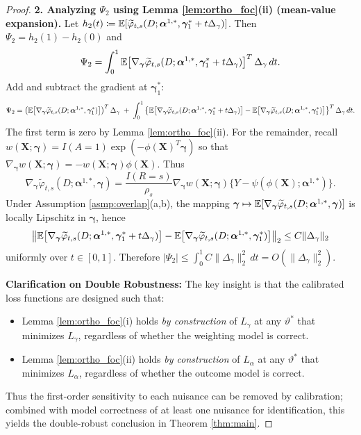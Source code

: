 \documentclass{article}
\begin{document}
\begin{proof}
\textbf{2. Analyzing $\Psi_2$ using Lemma \ref{lem:ortho_foc}(ii) (mean-value expansion).}
Let $h_2(t)\coloneqq \operatorname{\mathbb{E}}[\widetilde{\varphi}_{t,s}(D;\boldsymbol{\alpha}^{1,*},\boldsymbol{\gamma}_1^*+t\Delta_\gamma)]$.
Then $\Psi_2=h_2(1)-h_2(0)$ and
\[
\Psi_2
=
\int_0^1 \operatorname{\mathbb{E}}\!\left[\nabla_{\boldsymbol{\gamma}}\widetilde{\varphi}_{t,s}(D;\boldsymbol{\alpha}^{1,*},\boldsymbol{\gamma}_1^*+t\Delta_\gamma)\right]^T\Delta_\gamma\,dt.
\]
Add and subtract the gradient at $\boldsymbol{\gamma}_1^*$:
\[
\Psi_2
=
\left(\operatorname{\mathbb{E}}\!\left[\nabla_{\boldsymbol{\gamma}}\widetilde{\varphi}_{t,s}(D;\boldsymbol{\alpha}^{1,*},\boldsymbol{\gamma}_1^*)\right]\right)^T\Delta_\gamma
\;+\;
\int_0^1\left\{\operatorname{\mathbb{E}}\!\left[\nabla_{\boldsymbol{\gamma}}\widetilde{\varphi}_{t,s}(D;\boldsymbol{\alpha}^{1,*},\boldsymbol{\gamma}_1^*+t\Delta_\gamma)\right]
-\operatorname{\mathbb{E}}\!\left[\nabla_{\boldsymbol{\gamma}}\widetilde{\varphi}_{t,s}(D;\boldsymbol{\alpha}^{1,*},\boldsymbol{\gamma}_1^*)\right]\right\}^T\Delta_\gamma\,dt.
\]
The first term is zero by Lemma \ref{lem:ortho_foc}(ii). For the remainder, recall
$w(\boldsymbol{X};\boldsymbol{\gamma})=I(A=1)\exp(-\phi(\boldsymbol{X})^T\boldsymbol{\gamma})$ so that $\nabla_{\boldsymbol{\gamma}}w(\boldsymbol{X};\boldsymbol{\gamma})=-w(\boldsymbol{X};\boldsymbol{\gamma})\phi(\boldsymbol{X})$.
Thus
\[
\nabla_{\boldsymbol{\gamma}}\widetilde{\varphi}_{t,s}(D;\boldsymbol{\alpha}^{1,*},\boldsymbol{\gamma})
=
\frac{I(R=s)}{\rho_s}\nabla_{\boldsymbol{\gamma}}w(\boldsymbol{X};\boldsymbol{\gamma})\{Y-\psi(\phi(\boldsymbol{X});\boldsymbol{\alpha}^{1,*})\}.
\]
Under Assumption \ref{asmp:overlap}(a,b), the mapping $\boldsymbol{\gamma}\mapsto \operatorname{\mathbb{E}}[\nabla_{\boldsymbol{\gamma}}\widetilde{\varphi}_{t,s}(D;\boldsymbol{\alpha}^{1,*},\boldsymbol{\gamma})]$ is locally Lipschitz in $\boldsymbol{\gamma}$, hence
\[
\left\|
\operatorname{\mathbb{E}}\!\left[\nabla_{\boldsymbol{\gamma}}\widetilde{\varphi}_{t,s}(D;\boldsymbol{\alpha}^{1,*},\boldsymbol{\gamma}_1^*+t\Delta_\gamma)\right]
-\operatorname{\mathbb{E}}\!\left[\nabla_{\boldsymbol{\gamma}}\widetilde{\varphi}_{t,s}(D;\boldsymbol{\alpha}^{1,*},\boldsymbol{\gamma}_1^*)\right]
\right\|_2
\le
C\|\Delta_\gamma\|_2
\]
uniformly over $t\in[0,1]$. Therefore $|\Psi_2|\le \int_0^1 C\|\Delta_\gamma\|_2^2\,dt = O(\|\Delta_\gamma\|_2^2)$.

\textbf{Clarification on Double Robustness:} The key insight is that the calibrated loss functions are designed such that:
\begin{itemize}
    \item Lemma \ref{lem:ortho_foc}(i) holds \textit{by construction} of $L_\gamma$ at any $\vartheta^*$ that minimizes $L_\gamma$, regardless of whether the weighting model is correct.
    \item Lemma \ref{lem:ortho_foc}(ii) holds \textit{by construction} of $L_\alpha$ at any $\vartheta^*$ that minimizes $L_\alpha$, regardless of whether the outcome model is correct.
\end{itemize}
Thus the first-order sensitivity to each nuisance can be removed by calibration; combined with model correctness of at least one nuisance for identification, this yields the double-robust conclusion in Theorem \ref{thm:main}.
\end{proof}
\end{document}
